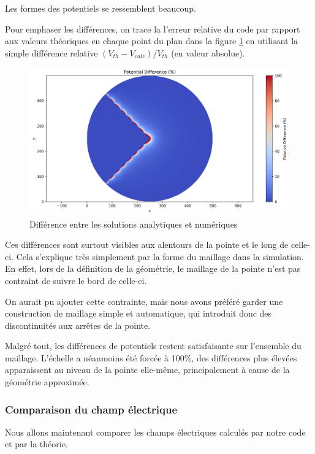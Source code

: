 \documentclass{article}
\begin{document}
Les formes des potentiels se ressemblent beaucoup.

Pour emphaser les différences, on trace la l'erreur relative
du code par rapport aux valeurs théoriques en chaque point du plan
dans la figure \ref{fig:diff} en utilisant la simple différence
relative $(V_{th} - V_{calc}) / V_{th}$ (en valeur absolue).

\begin{figure}[!h]
    \centering
    \includegraphics[width=\textwidth]{img/difference.png}
    \caption{Différence entre les solutions analytiques et numériques}
    \label{fig:diff}
\end{figure}

Ces différences sont surtout visibles aux alentours de la pointe
et le long de celle-ci. Cela s'explique très simplement par
la forme du maillage dans la simulation. En effet, lors de la
définition de la géométrie, le maillage de la pointe n'est pas
contraint de suivre le bord de celle-ci.

On aurait pu ajouter
cette contrainte, mais nous avons préféré garder une construction
de maillage simple et automatique, qui introduit donc des 
discontinuités aux arrêtes de la pointe.

Malgré tout, les différences de potentiels restent satisfaisante
sur l'ensemble du maillage. L'échelle a néanmoins
été forcée à 100\%, des différences plus élevées apparaissent au niveau
de la pointe elle-même, principalement à cause de la géométrie
approximée.

\newpage

\subsubsection{Comparaison du champ électrique}

Nous allons maintenant comparer les champs électriques
calculés par notre code et par la théorie.
\end{document}
